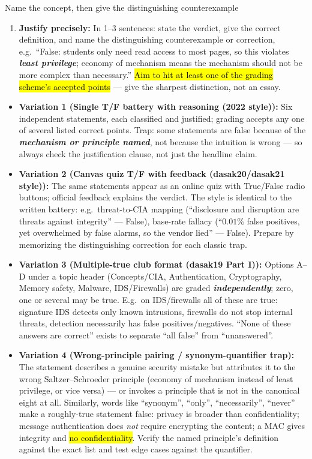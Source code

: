 \documentclass[12pt, a4paper]{article}
\newcommand{\term}[1]{\textbf{\textit{#1}}}        %
\newcommand{\imp}[1]{\hl{#1}}                       %
\begin{document}
\begin{schemebox}{Name the concept, then give the distinguishing counterexample}
\begin{enumerate}[label=\textbf{Step \arabic*:}, leftmargin=*]
    \item \textbf{Justify precisely:} In 1--3 sentences: state the verdict, give the correct definition, and name the distinguishing counterexample or correction, e.g.\ ``False: students only need read access to most pages, so this violates \term{least privilege}; economy of mechanism means the mechanism should not be more complex than necessary.'' \imp{Aim to hit at least one of the grading scheme's accepted points} --- give the sharpest distinction, not an essay.
\end{enumerate}
\end{schemebox}

\begin{trapbox}
\begin{itemize}
    \item \textbf{Variation 1 (Single T/F battery with reasoning (2022 style)):} Six independent statements, each classified and justified; grading accepts any one of several listed correct points. Trap: some statements are false because of the \term{mechanism or principle named}, not because the intuition is wrong --- so always check the justification clause, not just the headline claim.
    \item \textbf{Variation 2 (Canvas quiz T/F with feedback (dasak20/dasak21 style)):} The same statements appear as an online quiz with True/False radio buttons; official feedback explains the verdict. The style is identical to the written battery: e.g.\ threat-to-CIA mapping (``disclosure and disruption are threats against integrity'' --- False), base-rate fallacy (``$0.01\%$ false positives, yet overwhelmed by false alarms, so the vendor lied'' --- False). Prepare by memorizing the distinguishing correction for each classic trap.
    \item \textbf{Variation 3 (Multiple-true club format (dasak19 Part I)):} Options A--D under a topic header (Concepts/CIA, Authentication, Cryptography, Memory safety, Malware, IDS/Firewalls) are graded \term{independently}; zero, one or several may be true. E.g.\ on IDS/firewalls all of these are true: signature IDS detects only known intrusions, firewalls do not stop internal threats, detection necessarily has false positives/negatives. ``None of these answers are correct'' exists to separate ``all false'' from ``unanswered''.
    \item \textbf{Variation 4 (Wrong-principle pairing / synonym-quantifier trap):} The statement describes a genuine security mistake but attributes it to the wrong Saltzer--Schroeder principle (economy of mechanism instead of least privilege, or vice versa) --- or invokes a principle that is not in the canonical eight at all. Similarly, words like ``synonym'', ``only'', ``necessarily'', ``never'' make a roughly-true statement false: privacy is broader than confidentiality; message authentication does \emph{not} require encrypting the content; a MAC gives integrity and \imp{no confidentiality}. Verify the named principle's definition against the exact list and test edge cases against the quantifier.

\end{itemize}
\end{trapbox}
\end{document}
